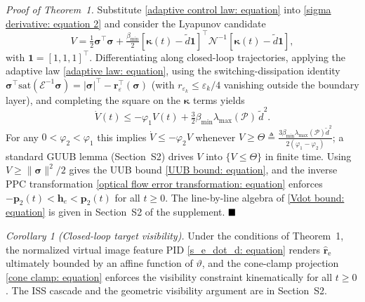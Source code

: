 \textit{Proof of Theorem~1.} Substitute \eqref{adaptive control law: equation} into \eqref{sigma derivative: equation 2} and consider the Lyapunov candidate
\begin{equation} \label{V candidate: equation}
    V = \tfrac{1}{2}\boldsymbol{\sigma}^\top\boldsymbol{\sigma} + \tfrac{\beta_{\min}}{2}[\boldsymbol{\kappa}(t)-\tilde{d}\boldsymbol{1}]^\top\mathcal{N}^{-1}[\boldsymbol{\kappa}(t)-\tilde{d}\boldsymbol{1}],
\end{equation}
with $\boldsymbol{1}=[1,1,1]^\top$. Differentiating along closed-loop trajectories, applying the adaptive law \eqref{adaptive law: equation}, using the switching-dissipation identity $\boldsymbol{\sigma}^\top\text{sat}(\mathcal{E}^{-1}\boldsymbol{\sigma})=|\boldsymbol{\sigma}|^\top-\boldsymbol{r}_\varepsilon^\top(\boldsymbol{\sigma})$ (with $r_{\varepsilon_k}\le\varepsilon_k/4$ vanishing outside the boundary layer), and completing the square on the $\boldsymbol{\kappa}$ terms yields
\begin{equation} \label{Vdot bound: equation}
    \dot{V}(t) \le -\varphi_1 V(t) + \tfrac{3}{2}\beta_{\min}\lambda_{\max}(\mathcal{P})\,\tilde{d}^2.
\end{equation}
For any $0<\varphi_2<\varphi_1$ this implies $\dot{V}\le-\varphi_2 V$ whenever $V\ge\Theta\triangleq \tfrac{3\beta_{\min}\lambda_{\max}(\mathcal{P})\tilde{d}^2}{2(\varphi_1-\varphi_2)}$; a standard GUUB lemma (Section~S2) drives $V$ into $\{V\le\Theta\}$ in finite time. Using $V\ge\|\boldsymbol{\sigma}\|^2/2$ gives the UUB bound \eqref{UUB bound: equation}, and the inverse PPC transformation \eqref{optical flow error transformation: equation} enforces $-\boldsymbol{p}_2(t)<\boldsymbol{h}_e<\boldsymbol{p}_2(t)$ for all $t\ge 0$. The line-by-line algebra of \eqref{Vdot bound: equation} is given in Section~S2 of the supplement. $\hfill\blacksquare$

\textit{Corollary 1 (Closed-loop target visibility).} Under the conditions of Theorem~1, the normalized virtual image feature PID \eqref{s_e_dot_d: equation} renders $\hat{\boldsymbol{r}}_\text{e}$ ultimately bounded by an affine function of $\vartheta$, and the cone-clamp projection \eqref{cone clamp: equation} enforces the visibility constraint kinematically for all $t\ge 0$. The ISS cascade and the geometric visibility argument are in Section~S2.

